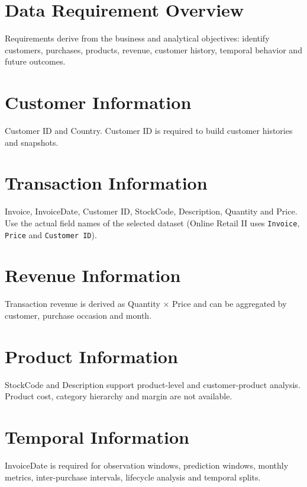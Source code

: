 \section{Data Requirement Overview}
\label{sec:4-1}

Requirements derive from the business and analytical objectives: identify customers, purchases, products, revenue, customer history, temporal behavior and future outcomes.

\section{Customer Information}
\label{sec:4-2}

Customer ID and Country. Customer ID is required to build customer histories and snapshots.

\section{Transaction Information}
\label{sec:4-3}

Invoice, InvoiceDate, Customer ID, StockCode, Description, Quantity and Price. Use the actual field names of the selected dataset (Online Retail II uses \texttt{Invoice}, \texttt{Price} and \texttt{Customer ID}).

\section{Revenue Information}
\label{sec:4-4}

Transaction revenue is derived as Quantity $\times$ Price and can be aggregated by customer, purchase occasion and month.

\section{Product Information}
\label{sec:4-5}

StockCode and Description support product-level and customer-product analysis. Product cost, category hierarchy and margin are not available.

\section{Temporal Information}
\label{sec:4-6}

InvoiceDate is required for observation windows, prediction windows, monthly metrics, inter-purchase intervals, lifecycle analysis and temporal splits.

